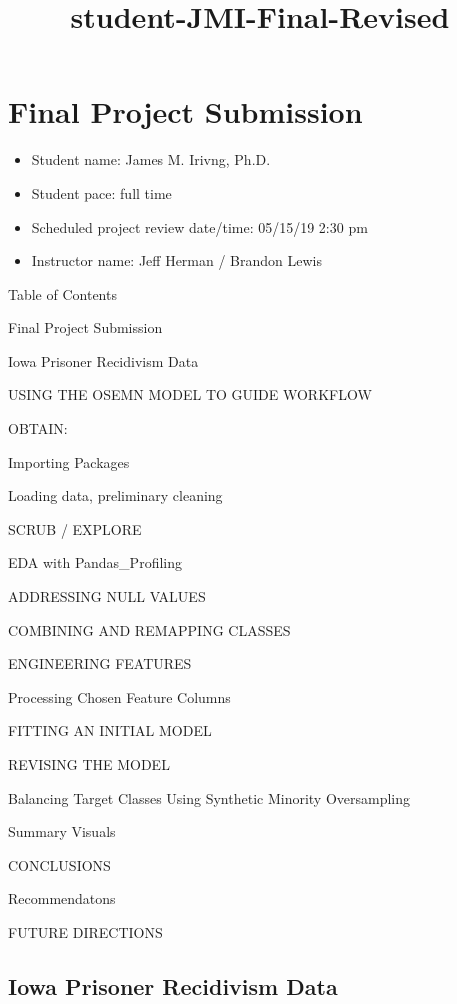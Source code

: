 \documentclass[11pt]{article}
\title{student-JMI-Final-Revised}
\providecommand{\tightlist}{%
      \setlength{\itemsep}{0pt}\setlength{\parskip}{0pt}}
\begin{document}
    
    
    \maketitle
    
    

    
    \hypertarget{final-project-submission}{%
\section{Final Project Submission}\label{final-project-submission}}

\begin{itemize}
\tightlist
\item
  Student name: James M. Irivng, Ph.D.
\item
  Student pace: full time
\item
  Scheduled project review date/time: 05/15/19 2:30 pm
\item
  Instructor name: Jeff Herman / Brandon Lewis
\end{itemize}

    Table of Contents{}

{Final Project Submission}

{Iowa Prisoner Recidivism Data}

{USING THE OSEMN MODEL TO GUIDE WORKFLOW}

{OBTAIN:}

{Importing Packages}

{Loading data, preliminary cleaning}

{SCRUB / EXPLORE}

{EDA with Pandas\_Profiling}

{ADDRESSING NULL VALUES}

{COMBINING AND REMAPPING CLASSES}

{ENGINEERING FEATURES}

{Processing Chosen Feature Columns}

{FITTING AN INITIAL MODEL}

{REVISING THE MODEL}

{Balancing Target Classes Using Synthetic Minority Oversampling}

{Summary Visuals}

{CONCLUSIONS}

{Recommendatons}

{FUTURE DIRECTIONS}

    \hypertarget{iowa-prisoner-recidivism-data}{%
\subsection{Iowa Prisoner Recidivism
Data}\label{iowa-prisoner-recidivism-data}}
\end{document}
